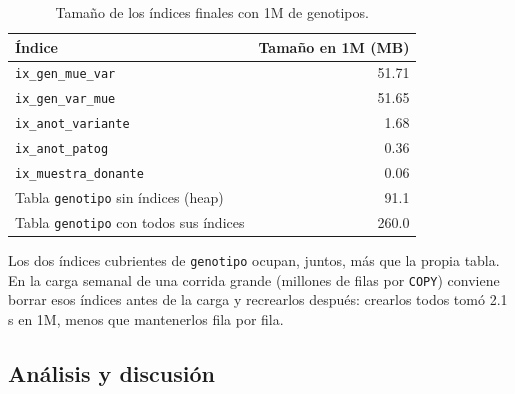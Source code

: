 \begin{table}[H]
\centering\small
\begin{tabular}{@{}lr@{}}
\toprule
Índice & Tamaño en 1M (MB) \\
\midrule
\texttt{ix\_\allowbreak{}gen\_\allowbreak{}mue\_\allowbreak{}var} & 51.71 \\
\texttt{ix\_\allowbreak{}gen\_\allowbreak{}var\_\allowbreak{}mue} & 51.65 \\
\texttt{ix\_\allowbreak{}anot\_\allowbreak{}variante} & 1.68 \\
\texttt{ix\_\allowbreak{}anot\_\allowbreak{}patog} & 0.36 \\
\texttt{ix\_\allowbreak{}muestra\_\allowbreak{}donante} & 0.06 \\
\midrule
Tabla \texttt{genotipo} sin índices (heap) & 91.1 \\
Tabla \texttt{genotipo} con todos sus índices & 260.0 \\
\bottomrule
\end{tabular}
\caption{Tamaño de los índices finales con 1M de genotipos.}
\end{table}

Los dos índices cubrientes de \texttt{genotipo} ocupan, juntos, más que la propia tabla. En la carga semanal de
una corrida grande (millones de filas por \texttt{COPY}) conviene borrar esos índices antes de la carga y
recrearlos después: crearlos todos tomó 2.1 s en 1M, menos que mantenerlos fila por fila.

\subsection{Análisis y discusión}

